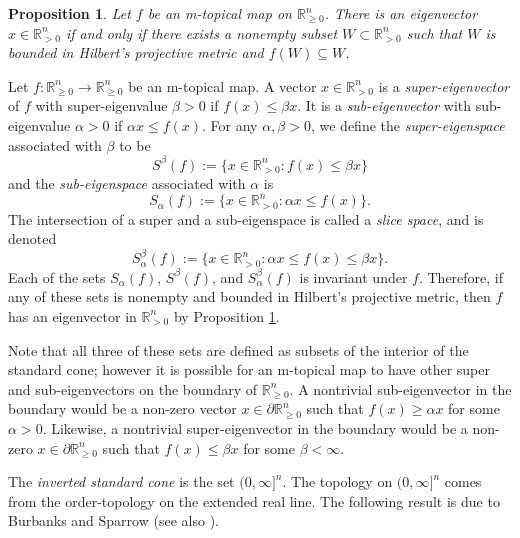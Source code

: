 \documentclass[10pt,reqno]{amsart}
\newcommand{\R}{\mathbb{R}}
\newcommand{\N}{\mathbb{N}}
\theoremstyle{plain}
\newtheorem{proposition}[theorem]{Proposition}
\theoremstyle{definition}
\numberwithin{equation}{section}
\begin{document}
\begin{proposition} \label{prop:boundedorbit}
Let $f$ be an m-topical map on $\R^n_{\ge 0}$. There is an eigenvector $x \in \R^n_{>0}$ if and only if there exists a nonempty subset $W \subset \R^n_{>0}$ such that $W$ is bounded in Hilbert's projective metric and $f(W) \subseteq W$.
\end{proposition}


Let $f:\R^n_{\ge 0} \rightarrow \R^n_{\ge 0}$ be an m-topical map. A vector $x \in \R^n_{>0}$ is a \emph{super-eigenvector} of $f$ with super-eigenvalue $\beta > 0$ if $f(x) \le \beta x$.  It is a \emph{sub-eigenvector} with sub-eigenvalue $\alpha > 0$ if $\alpha x \le f(x)$.  For any $\alpha, \beta > 0$, we define the \emph{super-eigenspace} associated with $\beta$ to be
$$S^\beta(f) := \{x \in \R^n_{>0} : f(x) \le \beta x \}$$
and the \emph{sub-eigenspace} associated with $\alpha$ is
$$S_\alpha(f) := \{x \in \R^n_{>0} : \alpha x \le f(x) \}.$$
The intersection of a super and a sub-eigenspace is called a \emph{slice space}, and is denoted
$$S_\alpha^\beta(f) := \{x \in \R^n_{>0} : \alpha x \le f(x) \le \beta x\}.$$
Each of the sets $S_\alpha(f)$, $S^\beta(f)$, and $S_\alpha^\beta(f)$ is invariant under $f$.  Therefore, if any of these sets is nonempty and bounded in Hilbert's projective metric, then $f$ has an eigenvector in $\R^n_{>0}$ by Proposition \ref{prop:boundedorbit}. 

Note that all three of these sets are defined as subsets of the interior of the standard cone; however it is possible for an m-topical map to have other super and sub-eigenvectors on the boundary of $\R^n_{\ge 0}$.  A nontrivial sub-eigenvector in the boundary would be a non-zero vector $x \in \partial \R^n_{\ge 0}$ such that $f(x) \ge \alpha x$ for some $\alpha > 0$. Likewise, a nontrivial super-eigenvector in the boundary would be a non-zero $x \in \partial \R^n_{\ge 0}$ such that $f(x) \le \beta x$ for some $\beta < \infty$.  

The \emph{inverted standard cone} is the set $(0,\infty]^n$. The topology on $(0,\infty]^n$ comes from the order-topology on the extended real line. The following result is due to Burbanks and Sparrow \cite[Corollary 2]{BurbanksSparrow99} (see also \cite[Corollary 4.6]{BurbanksNussbaumSparrow03}).
\end{document}
